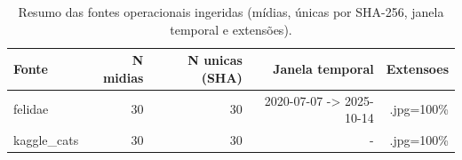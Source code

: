 \begin{table}[!htb]
\centering
\caption{Resumo das fontes operacionais ingeridas (mídias, únicas por SHA-256, janela temporal e extensões).}
\label{tab:fontes-resumo}
\begin{tabular}{lrrrr}
\toprule
Fonte & N midias & N unicas (SHA) & Janela temporal & Extensoes \\
\midrule
felidae & 30 & 30 & 2020-07-07 -> 2025-10-14 & .jpg=100\% \\
kaggle\_cats & 30 & 30 & - & .jpg=100\% \\
\bottomrule
\end{tabular}
\end{table}

